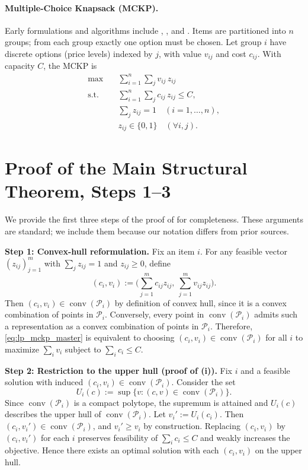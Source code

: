 \documentclass[11pt, a4paper]{article}
\theoremstyle{plain}
\theoremstyle{definition}
\theoremstyle{remark}
\begin{document}
\paragraph{Multiple-Choice Knapsack (MCKP).}
Early formulations and algorithms include \citet{Nauss1978}, \citet{Ibaraki1978}, and \citet{Sinha1979}. Items are partitioned into $n$ groups; from each group exactly one option must be chosen.
Let group $i$ have discrete options (price levels) indexed by $j$, with value $v_{ij}$ and cost $c_{ij}$. With capacity $C$, the MCKP is
\begin{align}
    \max \quad & \sum_{i=1}^n \sum_j v_{ij}\,z_{ij} \label{eq:mckp_obj}\\
    \text{s.t.}\quad & \sum_{i=1}^n \sum_j c_{ij}\,z_{ij} \le C, \label{eq:mckp_cap}\\
    & \sum_j z_{ij}=1 \quad (i=1,\dots,n), \label{eq:mckp_choice}\\
    & z_{ij}\in\{0,1\}\quad (\forall i,j). \label{eq:mckp_bin}
\end{align}




\section{Proof of the Main Structural Theorem, Steps 1--3}\label{app:thm2_steps}
We provide the first three steps of the proof of  for completeness. These arguments are standard; we include them because our notation differs from prior sources.

\textbf{Step 1: Convex-hull reformulation.}
Fix an item $i$. For any feasible vector $(z_{ij})_{j=1}^m$ with $\sum_j z_{ij}=1$ and $z_{ij}\ge 0$, define
\[
(c_i,v_i):=\Big(\sum_{j=1}^m c_{ij}z_{ij},\ \sum_{j=1}^m v_{ij}z_{ij}\Big).
\]
Then $(c_i,v_i)\in \operatorname{conv}(\mathcal P_i)$ by definition of convex hull, since it is a convex combination of points in $\mathcal P_i$.
Conversely, every point in $\operatorname{conv}(\mathcal P_i)$ admits such a representation as a convex combination of points in $\mathcal P_i$.
Therefore, \eqref{eq:lp_mckp_master} is equivalent to choosing $(c_i,v_i)\in \operatorname{conv}(\mathcal P_i)$ for all $i$ to maximize
$\sum_i v_i$ subject to $\sum_i c_i\le C$.

\textbf{Step 2: Restriction to the upper hull (proof of (i)).}
Fix $i$ and a feasible solution with induced $(c_i,v_i)\in\operatorname{conv}(\mathcal P_i)$.
Consider the set
\[
U_i(c):=\sup\{v : (c,v)\in\operatorname{conv}(\mathcal P_i)\}.
\]
Since $\operatorname{conv}(\mathcal P_i)$ is a compact polytope, the supremum is attained and $U_i(c)$ describes the upper hull
of $\operatorname{conv}(\mathcal P_i)$.
Let $v_i':=U_i(c_i)$. Then $(c_i,v_i')\in\operatorname{conv}(\mathcal P_i)$, and $v_i'\ge v_i$ by construction.
Replacing $(c_i,v_i)$ by $(c_i,v_i')$ for each $i$ preserves feasibility of $\sum_i c_i\le C$ and weakly increases the objective.
Hence there exists an optimal solution with each $(c_i,v_i)$ on the upper hull.
\end{document}
